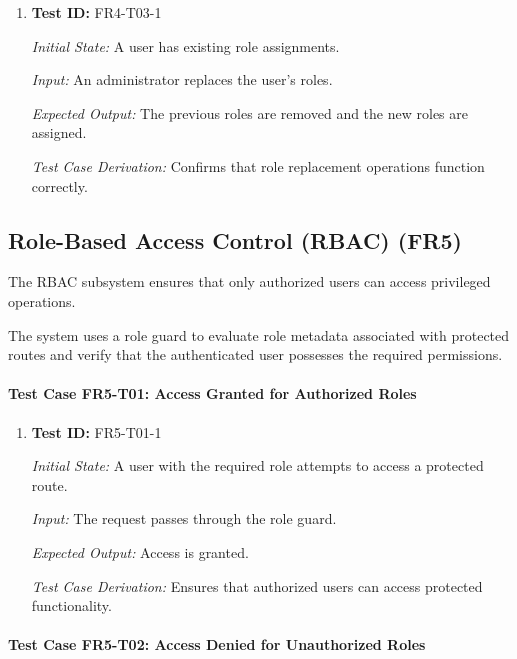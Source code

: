 \documentclass[12pt, titlepage]{article}
\begin{document}
\begin{enumerate}

\item \textbf{Test ID:} FR4-T03-1

\textit{Initial State:} A user has existing role assignments.

\textit{Input:} An administrator replaces the user's roles.

\textit{Expected Output:} The previous roles are removed and the new roles are assigned.

\textit{Test Case Derivation:} Confirms that role replacement operations function correctly.

\end{enumerate}



\subsection{Role-Based Access Control (RBAC) (FR5)}

The RBAC subsystem ensures that only authorized users can access privileged operations.

The system uses a role guard to evaluate role metadata associated with protected routes and verify that the authenticated user possesses the required permissions.

\paragraph{Test Case FR5-T01: Access Granted for Authorized Roles}

\begin{enumerate}

\item \textbf{Test ID:} FR5-T01-1

\textit{Initial State:} A user with the required role attempts to access a protected route.

\textit{Input:} The request passes through the role guard.

\textit{Expected Output:} Access is granted.

\textit{Test Case Derivation:} Ensures that authorized users can access protected functionality.

\end{enumerate}


\paragraph{Test Case FR5-T02: Access Denied for Unauthorized Roles}
\end{document}
